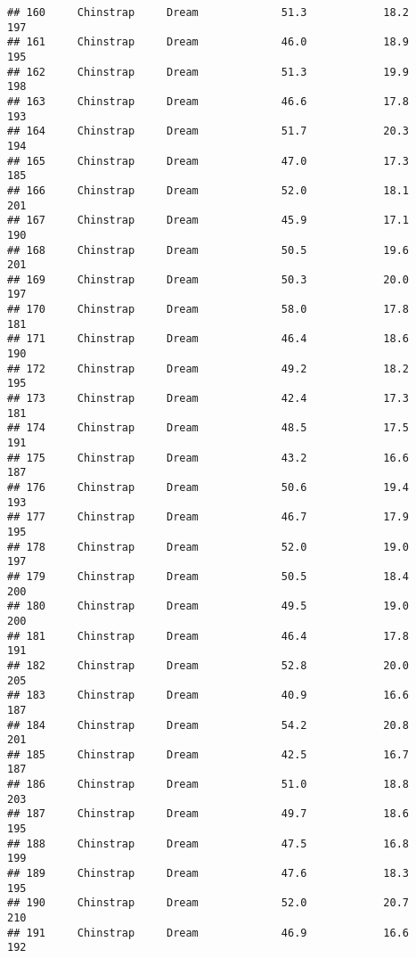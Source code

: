 \documentclass[
]{article}
\begin{document}
\begin{verbatim}
## 160     Chinstrap     Dream             51.3            18.2               197
## 161     Chinstrap     Dream             46.0            18.9               195
## 162     Chinstrap     Dream             51.3            19.9               198
## 163     Chinstrap     Dream             46.6            17.8               193
## 164     Chinstrap     Dream             51.7            20.3               194
## 165     Chinstrap     Dream             47.0            17.3               185
## 166     Chinstrap     Dream             52.0            18.1               201
## 167     Chinstrap     Dream             45.9            17.1               190
## 168     Chinstrap     Dream             50.5            19.6               201
## 169     Chinstrap     Dream             50.3            20.0               197
## 170     Chinstrap     Dream             58.0            17.8               181
## 171     Chinstrap     Dream             46.4            18.6               190
## 172     Chinstrap     Dream             49.2            18.2               195
## 173     Chinstrap     Dream             42.4            17.3               181
## 174     Chinstrap     Dream             48.5            17.5               191
## 175     Chinstrap     Dream             43.2            16.6               187
## 176     Chinstrap     Dream             50.6            19.4               193
## 177     Chinstrap     Dream             46.7            17.9               195
## 178     Chinstrap     Dream             52.0            19.0               197
## 179     Chinstrap     Dream             50.5            18.4               200
## 180     Chinstrap     Dream             49.5            19.0               200
## 181     Chinstrap     Dream             46.4            17.8               191
## 182     Chinstrap     Dream             52.8            20.0               205
## 183     Chinstrap     Dream             40.9            16.6               187
## 184     Chinstrap     Dream             54.2            20.8               201
## 185     Chinstrap     Dream             42.5            16.7               187
## 186     Chinstrap     Dream             51.0            18.8               203
## 187     Chinstrap     Dream             49.7            18.6               195
## 188     Chinstrap     Dream             47.5            16.8               199
## 189     Chinstrap     Dream             47.6            18.3               195
## 190     Chinstrap     Dream             52.0            20.7               210
## 191     Chinstrap     Dream             46.9            16.6               192

\end{verbatim}
\end{document}
